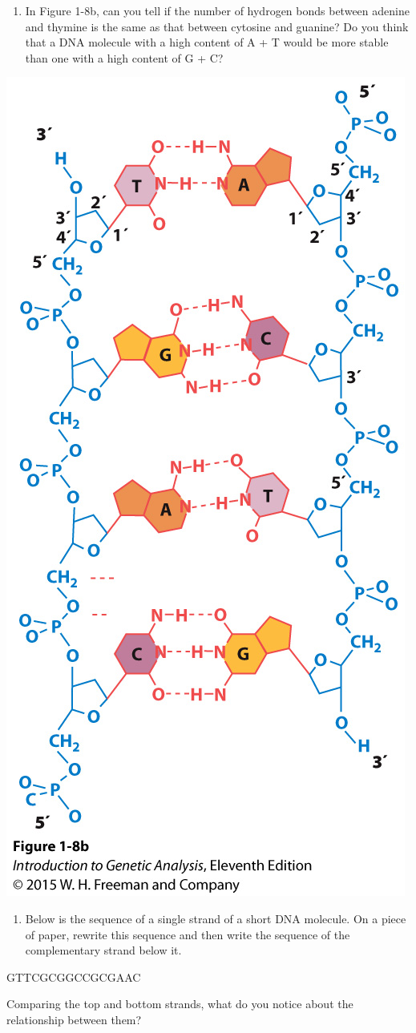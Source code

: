 \documentclass[11pt,]{article}
\providecommand{\tightlist}{%
  \setlength{\itemsep}{0pt}\setlength{\parskip}{0pt}}
\begin{document}
\begin{blackbox}

\begin{enumerate}
\def\labelenumi{\arabic{enumi}.}
\setcounter{enumi}{5}
\tightlist
\item
  In Figure 1-8b, can you tell if the number of hydrogen bonds between
  adenine and thymine is the same as that between cytosine and guanine?
  Do you think that a DNA molecule with a high content of A + T would be
  more stable than one with a high content of G + C?
\end{enumerate}

\hfill\break

\begin{center}\includegraphics[width=0.25\linewidth,]{input/figure_01_08b} \end{center}

\vspace{11cm}

\end{blackbox}

\begin{blackbox}

\begin{enumerate}
\def\labelenumi{\arabic{enumi}.}
\setcounter{enumi}{9}
\tightlist
\item
  Below is the sequence of a single strand of a short DNA molecule. On a
  piece of paper, rewrite this sequence and then write the sequence of
  the complementary strand below it.
\end{enumerate}

\vspace{10mm}

GTTCGCGGCCGCGAAC

\vspace{10mm}

Comparing the top and bottom strands, what do you notice about the
relationship between them?

\vspace{17cm}

\end{blackbox}
\end{document}
